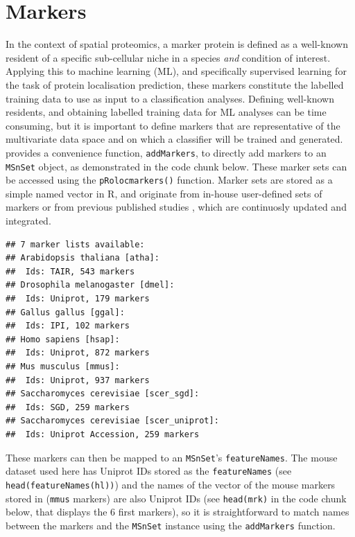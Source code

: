 \pagebreak

\section*{Markers}

In the context of spatial proteomics, a marker protein is defined as a
well-known resident of a specific sub-cellular niche in a species
\textit{and} condition of interest. Applying this to machine learning
(ML), and specifically supervised learning for the task of protein
localisation prediction, these markers constitute the labelled
training data to use as input to a classification analyses. Defining
well-known residents, and obtaining labelled training data for ML
analyses can be time consuming, but it is important to define markers
that are representative of the multivariate data space and on which a
classifier will be trained and generated.  provides a
convenience function, \texttt{addMarkers}, to directly add markers to
an \texttt{MSnSet} object, as demonstrated in the code chunk
below. These marker sets can be accessed using the
\texttt{pRolocmarkers()} function. Marker sets are stored as a simple
named vector in R, and originate from in-house user-defined sets of
markers or from previous published studies \cite{Gatto:2014b}, which
are continuosly updated and integrated.

\begin{knitrout}
\color{fgcolor}\begin{kframe}
\begin{alltt}
\hlstd{()}
\end{alltt}
\begin{verbatim}
## 7 marker lists available:
## Arabidopsis thaliana [atha]:
##  Ids: TAIR, 543 markers
## Drosophila melanogaster [dmel]:
##  Ids: Uniprot, 179 markers
## Gallus gallus [ggal]:
##  Ids: IPI, 102 markers
## Homo sapiens [hsap]:
##  Ids: Uniprot, 872 markers
## Mus musculus [mmus]:
##  Ids: Uniprot, 937 markers
## Saccharomyces cerevisiae [scer_sgd]:
##  Ids: SGD, 259 markers
## Saccharomyces cerevisiae [scer_uniprot]:
##  Ids: Uniprot Accession, 259 markers
\end{verbatim}
\end{kframe}
\end{knitrout}

These markers can then be mapped to an \texttt{MSnSet}'s
\texttt{featureNames}. The mouse dataset used here has Uniprot IDs
stored as the \texttt{featureNames} (see
\texttt{head(featureNames(hl))}) and the names of the vector of the
mouse markers stored in  (\texttt{mmus} markers) are
also Uniprot IDs (see \texttt{head(mrk)} in the code chunk below, that
displays the 6 first markers), so it is straightforward to match names
between the markers and the \texttt{MSnSet} instance using the
\texttt{addMarkers} function.


